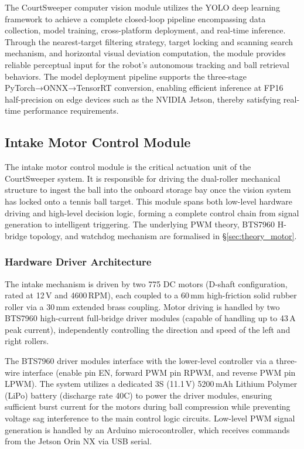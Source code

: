 The CourtSweeper computer vision module utilizes the YOLO deep learning framework to achieve a complete closed-loop pipeline encompassing data collection, model training, cross-platform deployment, and real-time inference. Through the nearest-target filtering strategy, target locking and scanning search mechanism, and horizontal visual deviation computation, the module provides reliable perceptual input for the robot's autonomous tracking and ball retrieval behaviors. The model deployment pipeline supports the three-stage PyTorch→ONNX→TensorRT conversion, enabling efficient inference at FP16 half-precision on edge devices such as the NVIDIA Jetson, thereby satisfying real-time performance requirements.

\subsection{Intake Motor Control Module}
\label{sec:motor}

The intake motor control module is the critical actuation unit of the CourtSweeper system. It is responsible for driving the dual-roller mechanical structure to ingest the ball into the onboard storage bay once the vision system has locked onto a tennis ball target. This module spans both low-level hardware driving and high-level decision logic, forming a complete control chain from signal generation to intelligent triggering. The underlying PWM theory, BTS7960 H-bridge topology, and watchdog mechanism are formalised in \S\ref{sec:theory_motor}.

\subsubsection{Hardware Driver Architecture}
\label{sec:motor_hw}

The intake mechanism is driven by two 775 DC motors (D-shaft configuration, rated at 12\,V and 4600\,RPM), each coupled to a 60\,mm high-friction solid rubber roller via a 30\,mm extended brass coupling. Motor driving is handled by two BTS7960 high-current full-bridge driver modules (capable of handling up to 43\,A peak current), independently controlling the direction and speed of the left and right rollers.

The BTS7960 driver modules interface with the lower-level controller via a three-wire interface (enable pin EN, forward PWM pin RPWM, and reverse PWM pin LPWM). The system utilizes a dedicated 3S (11.1\,V) 5200\,mAh Lithium Polymer (LiPo) battery (discharge rate 40C) to power the driver modules, ensuring sufficient burst current for the motors during ball compression while preventing voltage sag interference to the main control logic circuits. Low-level PWM signal generation is handled by an Arduino microcontroller, which receives commands from the Jetson Orin NX via USB serial.
